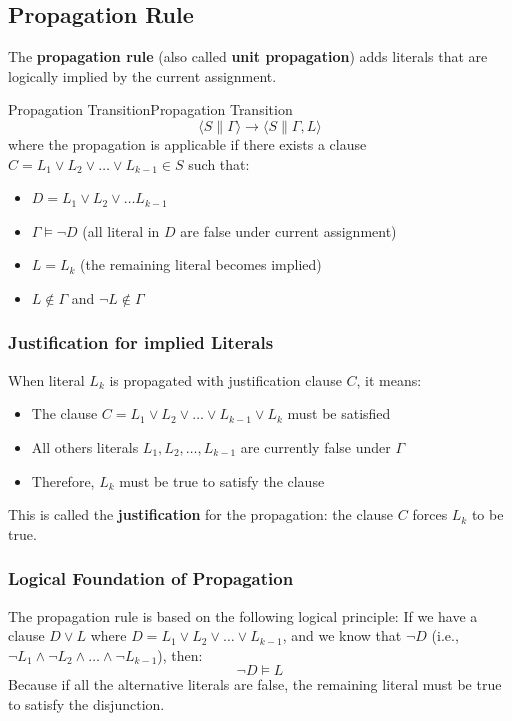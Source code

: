 \documentclass[a4paper]{article}
\theoremstyle{definition}
\begin{document}
\subsection{Propagation Rule}
The \textbf{propagation rule} (also called \textbf{unit propagation}) adds literals that are logically implied by the current assignment.
\begin{definition}{Propagation Transition}{Propagation Transition}
\[
  \langle S \parallel \varGamma \rangle \rightarrow \langle S \parallel \varGamma, L \rangle
\]
where the propagation is applicable if there exists a clause \( C = L_1 \vee L_2 \vee \ldots \vee L_{k - 1} \in S \) such that:
\begin{itemize}
    \item \( D = L_1 \vee L_2 \vee \ldots L_{k - 1} \)     
    \item \( \varGamma \models \lnot D \) (all literal in $D$ are false under current assignment)
    \item \( L = L_k \) (the remaining literal becomes implied)
    \item \( L \notin \varGamma \) and \( \lnot L \notin \varGamma \)   
\end{itemize}
\end{definition}
\subsubsection{Justification for implied Literals}
When literal \( L_k \) is propagated with justification clause \( C \), it means:
\begin{itemize}
    \item The clause \( C = L_1 \vee L_2 \vee \ldots \vee L_{k - 1} \vee L_k \) must be satisfied 
    \item All others literals \( L_1, L_2, \ldots, L_{k - 1} \) are currently false under $\varGamma$
    \item Therefore, \( L_k \) must be true to satisfy the clause
\end{itemize}
This is called the \textbf{justification} for the propagation: the clause \( C \) forces \( L_k \) to be true.
\subsubsection{Logical Foundation of Propagation}
The propagation rule is based on the following logical principle:
\vspace{1em}
\noindent
\newline
If we have a clause \( D \vee L \) where \( D = L_1 \vee L_2 \vee \ldots \vee L_{k - 1} \), and we know that \( \lnot D \) (i.e., 
$\lnot L_1 \wedge \lnot L_2 \wedge \ldots \wedge \lnot L_{k - 1}$), then: 
\[
  \lnot D \models L
\]
Because if all the alternative literals are false, the remaining literal must be true to satisfy the disjunction.
\end{document}
